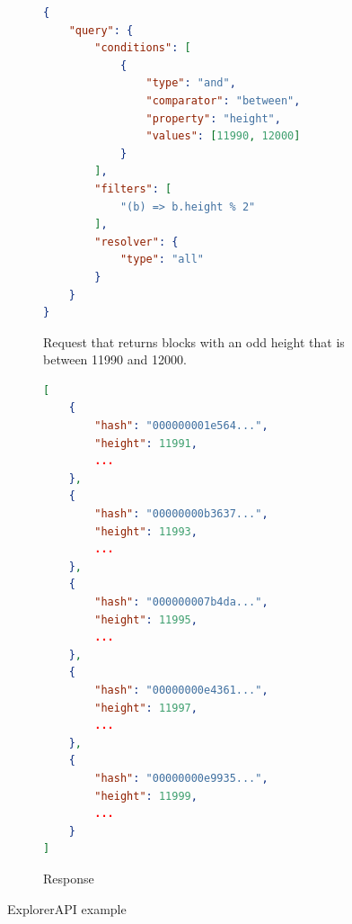 \begin{figure}[h]
    \begin{subfigure}[t]{.5\textwidth}
        \begin{lstlisting}[language=json]
{
    "query": {
        "conditions": [
            {
                "type": "and",
                "comparator": "between",
                "property": "height",
                "values": [11990, 12000]
            }
        ],
        "filters": [
            "(b) => b.height % 2"
        ],
        "resolver": {
            "type": "all"
        }
    }
}
        \end{lstlisting}
        \label{explorerApiRequest}
        \caption{Request that returns blocks with an odd height that is between 11990 and 12000.}
    \end{subfigure}
    \begin{subfigure}[t]{.5\textwidth}
        \begin{lstlisting}[language=json]
[
    {
        "hash": "000000001e564...",
        "height": 11991,
        ...
    },
    {
        "hash": "00000000b3637...",
        "height": 11993,
        ...
    },
    {
        "hash": "000000007b4da...",
        "height": 11995,
        ...
    },
    {
        "hash": "00000000e4361...",
        "height": 11997,
        ...
    },
    {
        "hash": "00000000e9935...",
        "height": 11999,
        ...
    }
]
        \end{lstlisting}
        \label{explorerApiResponse}
        \caption{Response}
    \end{subfigure}
    \caption{ExplorerAPI example}
    \label{explorerApiExample}
\end{figure}

 



